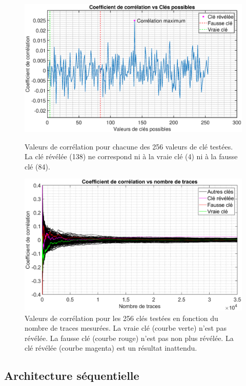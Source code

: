 \documentclass[oneside]{book}
\begin{document}
\begin{figure}[htbp]
    \hspace{-1.8cm}
    \includegraphics[scale=0.57]{image/real_trace_faking_parallele_corr_vs_cles}
    \caption{Valeurs de corrélation pour chacune des 256 valeurs de clé testées. La clé révélée (138) ne correspond ni à la vraie clé (4) ni à la fausse clé (84).}
    \label{fig:real_trace_faking_parallele_corr_vs_cles} 
    \hspace{-1.8cm}
    \includegraphics[scale=0.6]{image/real_trace_faking_parallele_corr_vs_nb_traces}
    \caption{Valeurs de corrélation pour les 256 clés testées en fonction du nombre de traces mesurées. La vraie clé (courbe verte) n'est pas révélée. La fausse clé (courbe rouge) n'est pas non plus révélée. La clé révélée (courbe magenta) est un résultat inattendu.}
    \label{fig:real_trace_faking_parallele_corr_vs_nb_traces} 
\end{figure}

\newpage

\subsection{Architecture séquentielle}
\label{subsec:séquentielle}
\end{document}
